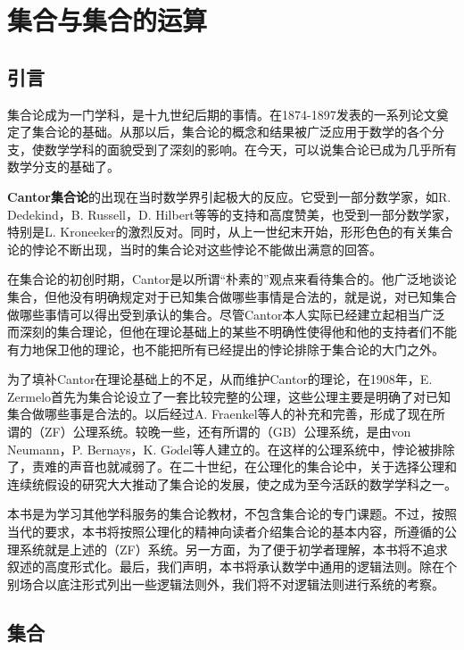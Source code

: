 \chapter{集合与集合的运算}

\section{引言}

集合论成为一门学科，是十九世纪后期的事情。在1874-1897发表的一系列论文奠定了集合论的基础。从那以后，集合论的概念和结果被广泛应用于数学的各个分支，使数学学科的面貌受到了深刻的影响。在今天，可以说集合论已成为几乎所有数学分支的基础了。


\textbf{Cantor集合论}的出现在当时数学界引起极大的反应。它受到一部分数学家，如R. Dedekind，B. Russell，D. Hilbert等等的支持和高度赞美，也受到一部分数学家，特别是L. Kroneeker的激烈反对。同时，从上一世纪末开始，形形色色的有关集合论的悖论不断出现，当时的集合论对这些悖论不能做出满意的回答。

在集合论的初创时期，Cantor是以所谓“朴素的”观点来看待集合的。他广泛地谈论集合，但他没有明确规定对于已知集合做哪些事情是合法的，就是说，对已知集合做哪些事情可以得出受到承认的集合。尽管Cantor本人实际已经建立起相当广泛而深刻的集合理论，但他在理论基础上的某些不明确性使得他和他的支持者们不能有力地保卫他的理论，也不能把所有已经提出的悖论排除于集合论的大门之外。

为了填补Cantor在理论基础上的不足，从而维护Cantor的理论，在1908年，E. Zermelo首先为集合论设立了一套比较完整的公理，这些公理主要是明确了对已知集合做哪些事是合法的。以后经过A. Fraenkel等人的补充和完善，形成了现在所谓的（ZF）公理系统。较晚一些，还有所谓的（GB）公理系统，是由von Neumann，P. Bernays，K. G$\ddot{o}$del等人建立的。在这样的公理系统中，悖论被排除了，责难的声音也就减弱了。在二十世纪，在公理化的集合论中，关于选择公理和连续统假设的研究大大推动了集合论的发展，使之成为至今活跃的数学学科之一。

本书是为学习其他学科服务的集合论教材，不包含集合论的专门课题。不过，按照当代的要求，本书将按照公理化的精神向读者介绍集合论的基本内容，所遵循的公理系统就是上述的（ZF）系统。另一方面，为了便于初学者理解，本书将不追求叙述的高度形式化。最后，我们声明，本书将承认数学中通用的逻辑法则。除在个别场合以底注形式列出一些逻辑法则外，我们将不对逻辑法则进行系统的考察。

\section{集合}

